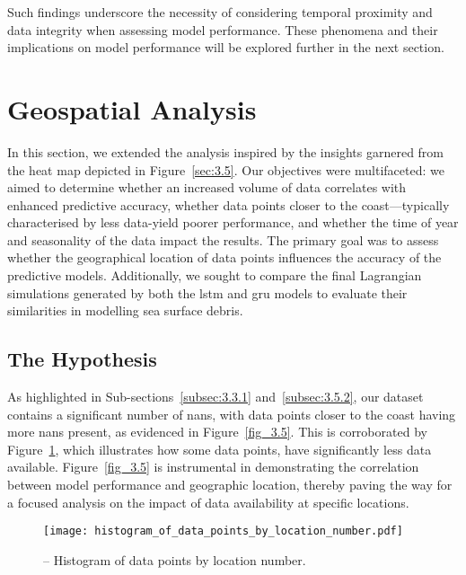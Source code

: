 Such findings underscore the necessity of considering temporal proximity and data integrity when assessing model performance. These phenomena and their implications on model performance will be explored further in the next section.

\section{Geospatial Analysis}
\label{sec:4.2}

In this section, we extended the analysis inspired by the insights garnered from the heat map depicted in Figure~\ref{sec:3.5}. Our objectives were multifaceted: we aimed to determine whether an increased volume of data correlates with enhanced predictive accuracy, whether data points closer to the coast—typically characterised by less data-yield poorer performance, and whether the time of year and seasonality of the data impact the results. The primary goal was to assess whether the geographical location of data points influences the accuracy of the predictive models. Additionally, we sought to compare the final Lagrangian simulations generated by both the \acrshort{lstm} and \acrshort{gru} models to evaluate their similarities in modelling sea surface debris.

\subsection{The Hypothesis}
\label{subsec:4.2.1}

As highlighted in Sub-sections~\ref{subsec:3.3.1} and~\ref{subsec:3.5.2}, our dataset contains a significant number of \acrshort{nan}s, with data points closer to the coast having more \acrshort{nan}s present, as evidenced in Figure~\ref{fig_3.5}. This is corroborated by Figure~\ref{fig_4.1}, which illustrates how some data points, have significantly less data available. Figure~\ref{fig_3.5} is instrumental in demonstrating the correlation between model performance and geographic location, thereby paving the way for a focused analysis on the impact of data availability at specific locations. 

\begin{figure}[htbp]
    \centering
    \texttt{[image: histogram\_of\_data\_points\_by\_location\_number.pdf]}
    \caption[Histogram of data points by location number.]{-- Histogram of data points by location number.\label{fig_4.1}}
\end{figure}

